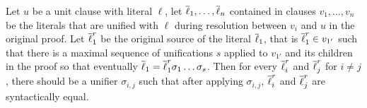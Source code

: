 \begin{property}
Let $u$ be a unit clause with literal $\ell$, let $\overline{\ell}_1,\ldots,\overline{\ell}_n$ contained in clauses $v_1,\ldots,v_n$ be the literals that are unified with $\ell$ during resolution between $v_i$ and $u$ in the original proof. Let $\overline{\ell}_1^r$ be the original source of the literal $\overline{\ell}_1$, that is $\overline{\ell}_1^r\in v_{1'}$ such that there is a maximal sequence of unifications $s$ applied to $v_{1'}$ and its children in the proof so that eventually $\overline{\ell}_1=\overline{\ell}_1^r\sigma_1\ldots\sigma_s$.
Then for every $\overline{\ell}_i^r$ and  $\overline{\ell}_j^r$ for $i\neq j$, there should be a unifier $\sigma_{i,j}$ such that after applying $\sigma_{i,j}$, $\overline{\ell}_i^r$ and $\overline{\ell}_j^r$ are syntactically equal.
\end{property}

